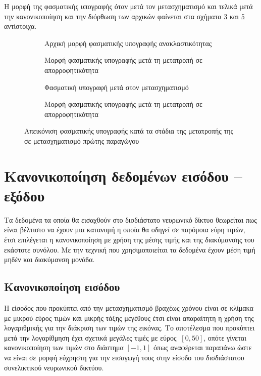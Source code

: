 Η μορφή της φασματικής υπογραφής όταν μετά τον μετασχηματισμό  και τελικά μετά την κανονικοποίηση και την διόρθωση των αρχικών φαίνεται στα σχήματα \ref{fig:abs_sg1_transform_notches} και \ref{fig:abs_sg1_transform_fixed} αντίστοιχα.\\

\begin{figure}[htbp]
    \begin{subfigure}{0.5\textwidth}
        
        \caption{Αρχική μορφή φασματικής υπογραφής ανακλαστικότητας}
        \label{fig:abs_sg1_initial}
    \end{subfigure}
    \begin{subfigure}{0.5\textwidth}
        
        \caption{Μορφή φασματικής υπογραφής μετά τη μετατροπή σε απορροφητικότητα}
        \label{fig:abs_sg1_abs}
    \end{subfigure}
    \begin{subfigure}{0.5\textwidth}
        
        \caption{Φασματική υπογραφή μετά στον μετασχηματισμό \tl{}}
        \label{fig:abs_sg1_transform_notches}
    \end{subfigure}
    \begin{subfigure}{0.5\textwidth}
        
        \caption{Μορφή φασματικής υπογραφής μετά τη μετατροπή σε απορροφητικότητα}
        \label{fig:abs_sg1_transform_fixed}
    \end{subfigure}
    \caption{Απεικόνιση φασματικής υπογραφής κατά τα στάδια της μετατροπής της σε μετασχηματισμό  πρώτης παραγώγου}
\end{figure}


\section{Κανονικοποίηση δεδομένων εισόδου -- εξόδου}
Τα δεδομένα τα οποία θα εισαχθούν στο δισδιάστατο νευρωνικό δίκτυο θεωρείται πως είναι βέλτιστο να έχουν μια κατανομή η οποία θα οδηγεί σε παρόμοια εύρη τιμών, έτσι επιλέγεται η κανονικοποίηση με χρήση της μέσης τιμής και της διακύμανσης του εκάστοτε συνόλου. Με την τεχνική που χρησιμοποιείται τα δεδομένα έχουν μέση τιμή μηδέν και διακύμανση μονάδα.

\subsection{Κανονικοποίηση εισόδου}
Η είσοδος που προκύπτει από την μετασχηματισμό  βραχέως χρόνου είναι σε κλίμακα με μικρού εύρος τιμών και μικρής τάξης μεγέθους έτσι είναι απαραίτητη η χρήση της λογαριθμικής για την διάκριση των τιμών της εικόνας. Το αποτέλεσμα που προκύπτει μετά την λογαρίθμηση έχει σχετικά μεγάλες τιμές με εύρος $~[0,50]$, οπότε γίνεται κανονικοποίηση των τιμών στο διάστημα $[-1,1]$ όπως αναφέρεται παραπάνω ώστε να είναι σε μορφή εύχρηστη για την εισαγωγή τους στην είσοδο του δισδιάστατου συνελικτικού νευρωνικού δικτύου.
